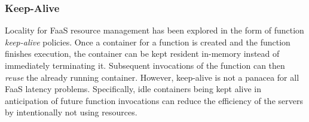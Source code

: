 \subsubsection{Keep-Alive}

Locality for FaaS resource management has been explored in the form of function \emph{keep-alive} policies. 
Once a container for a function is created and the function finishes execution, the container can be kept resident in-memory instead of immediately terminating it. 
Subsequent invocations of the function can then \emph{reuse} the already running container.
However, keep-alive is not a panacea for all FaaS latency problems.
Specifically, idle containers being kept alive in anticipation of future function invocations can reduce the efficiency of the servers by intentionally not using resources.

